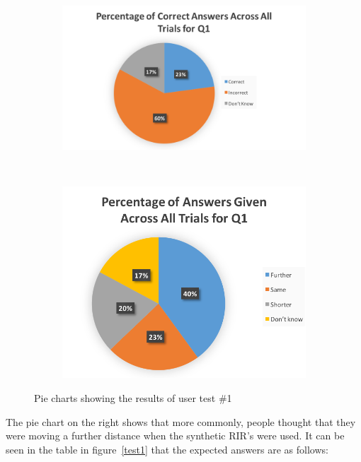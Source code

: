 \documentclass[../../main.tex]{subfiles}
\begin{document}
			\begin{figure}[H]
				\begin{subfigure}{0.5\textwidth}
					\centerline{\includegraphics[scale = 0.7]{Sections/userTesting/images/test1/Q1Pie1_edit.png}}
				\end{subfigure}
				~
				\begin{subfigure}{0.5\textwidth}
					\centerline{\includegraphics[scale = 0.7]{Sections/userTesting/images/test1/Q1Pie2.png}}
				\end{subfigure}
				\caption{Pie charts showing the results of user test \#1}
				\label{test1Results}
			\end{figure}


			The pie chart on the right shows that more commonly, people thought that they were moving a further distance when the synthetic \ac{RIR}'s were used. It can be seen in the table in figure~\ref{test1} that the expected answers are as follows:
\end{document}
